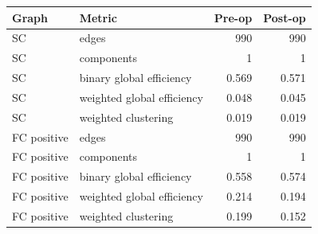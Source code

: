 \begin{tabular}{llrr}
\toprule
Graph & Metric & Pre-op & Post-op \\
\midrule
SC & edges & 990 & 990 \\
SC & components & 1 & 1 \\
SC & binary global efficiency & 0.569 & 0.571 \\
SC & weighted global efficiency & 0.048 & 0.045 \\
SC & weighted clustering & 0.019 & 0.019 \\
FC positive & edges & 990 & 990 \\
FC positive & components & 1 & 1 \\
FC positive & binary global efficiency & 0.558 & 0.574 \\
FC positive & weighted global efficiency & 0.214 & 0.194 \\
FC positive & weighted clustering & 0.199 & 0.152 \\
\bottomrule
\end{tabular}
